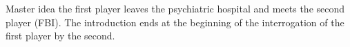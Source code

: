 Master idea
the first player leaves the psychiatric hospital and meets the second player (FBI). The introduction ends at the beginning of the interrogation of the first player by the second.